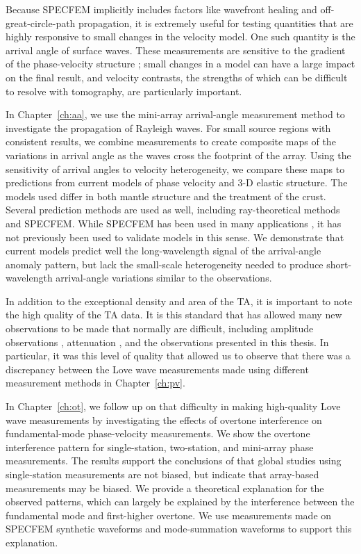 \documentclass[12pt,oneside]{book}
\begin{document}
Because SPECFEM implicitly includes factors like wavefront healing and off-great-circle-path propagation, it is extremely useful for testing quantities that are highly responsive to small changes in the velocity model. One such quantity is the arrival angle of surface waves. These measurements are sensitive to the gradient of the phase-velocity structure \citep{Larson2002}; small changes in a model can have a large impact on the final result, and velocity contrasts, the strengths of which can be difficult to resolve with tomography, are particularly important. 

In Chapter~\ref{ch:aa}, we use the mini-array arrival-angle measurement method to investigate the propagation of Rayleigh waves. For small source regions with consistent results, we combine measurements to create composite maps of the variations in arrival angle as the waves cross the footprint of the array. Using the sensitivity of arrival angles to velocity heterogeneity, we compare these maps to predictions from current models of phase velocity and 3\nobreakdash-D elastic structure. The models used differ in both mantle structure and the treatment of the crust. Several prediction methods are used as well, including ray-theoretical methods and SPECFEM. While SPECFEM has been used in many applications \citep[e.g.,][]{MalcolmTrampert2011, Zhuetal2012, Daltonetal2014}, it has not previously been used to validate models in this sense. We demonstrate that current models predict well the long-wavelength signal of the arrival-angle anomaly pattern, but lack the small-scale heterogeneity needed to produce short-wavelength arrival-angle variations similar to the observations. 

In addition to the exceptional density and area of the TA, it is important to note the high quality of the TA data. It is this standard that has allowed many new observations to be made that normally are difficult, including amplitude observations \citep[e.g.,][]{EddyEkstrom2014}, attenuation \citep[e.g.,][]{PhillipsStead2008}, and the observations presented in this thesis. In particular, it was this level of quality that allowed us to observe that there was a discrepancy between the Love wave measurements made using different measurement methods in Chapter~\ref{ch:pv}. 

In Chapter~\ref{ch:ot}, we follow up on that difficulty in making high-quality Love wave measurements by investigating the effects of overtone interference on fundamental-mode phase-velocity measurements. We show the overtone interference pattern for single-station, two-station, and mini-array phase measurements. The results support the conclusions of \citet{Nettles2011} that global studies using single-station measurements are not biased, but indicate that array-based measurements may be biased. We provide a theoretical explanation for the observed patterns, which can largely be explained by the interference between the fundamental mode and first-higher overtone. We use measurements made on SPECFEM synthetic waveforms and mode-summation waveforms to support this explanation.
\end{document}
